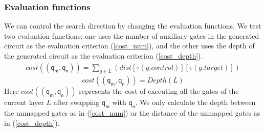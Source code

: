 \documentclass[journal]{IEEEtran}
\begin{document}
\subsubsection{Evaluation functions }
We can control the search direction by changing the evaluation functions.
We test two evaluation functions: one uses the number of auxiliary gates in the generated circuit as the evaluation criterion (\ref{cost_num}),  and the other uses the depth of the generated circuit as the evaluation criterion  (\ref{cost_depth}).
\begin{equation}
	 	\begin{aligned}
	cost((\textsf{q}_\textsf{m},\textsf{q}_\textsf{n}))=\sum_{g \in L}(dist[\tau(g.control)][\tau(g.target)])
    \label{cost_num}
         \end{aligned}
\end{equation}
	\begin{equation}
		cost((\textsf{q}_\textsf{m},\textsf{q}_\textsf{n}))= Depth(L)
		\label{cost_depth}
		\end{equation}
Here $cost((\textsf{q}_\textsf{m},\textsf{q}_\textsf{n}))$ represents the cost of executing all the gates of the current layer $L$ 
after swapping $\textsf{q}_\textsf{m}$ with $\textsf{q}_\textsf{n}$. We only calculate the depth between the unmapped gates as in (\ref{cost_num}) or the distance of the unmapped gates as in (\ref{cost_depth}).
\end{document}
